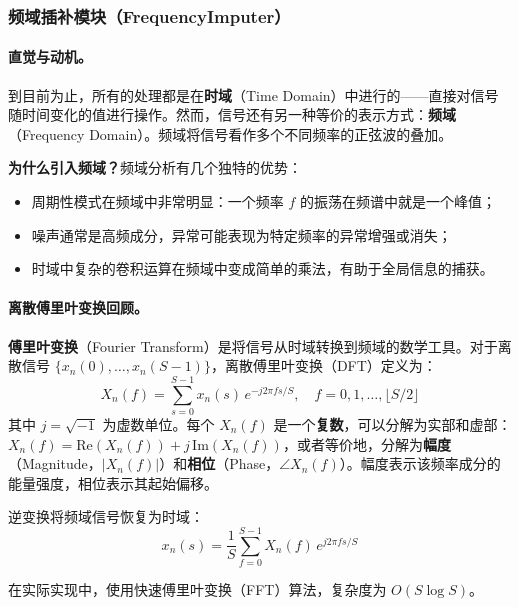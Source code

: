 \documentclass[UTF8]{ctexart}
\begin{document}
\subsubsection{频域插补模块（FrequencyImputer）}

\paragraph{直觉与动机。}

到目前为止，所有的处理都是在\textbf{时域}（Time Domain）中进行的——直接对信号随时间变化的值进行操作。然而，信号还有另一种等价的表示方式：\textbf{频域}（Frequency Domain）。频域将信号看作多个不同频率的正弦波的叠加。

\textbf{为什么引入频域？}频域分析有几个独特的优势：
\begin{itemize}
    \item 周期性模式在频域中非常明显：一个频率 $f$ 的振荡在频谱中就是一个峰值；
    \item 噪声通常是高频成分，异常可能表现为特定频率的异常增强或消失；
    \item 时域中复杂的卷积运算在频域中变成简单的乘法，有助于全局信息的捕获。
\end{itemize}

\paragraph{离散傅里叶变换回顾。}

\textbf{傅里叶变换}（Fourier Transform）是将信号从时域转换到频域的数学工具。对于离散信号 $\{x_n(0), \ldots, x_n(S-1)\}$，离散傅里叶变换（DFT）定义为：
\begin{equation}
    X_n(f) = \sum_{s=0}^{S-1} x_n(s) \, e^{-j 2\pi f s / S}, \quad f = 0, 1, \ldots, \lfloor S/2 \rfloor
\end{equation}
其中 $j = \sqrt{-1}$ 为虚数单位。每个 $X_n(f)$ 是一个\textbf{复数}，可以分解为实部和虚部：$X_n(f) = \mathrm{Re}(X_n(f)) + j \, \mathrm{Im}(X_n(f))$，或者等价地，分解为\textbf{幅度}（Magnitude，$|X_n(f)|$）和\textbf{相位}（Phase，$\angle X_n(f)$）。幅度表示该频率成分的能量强度，相位表示其起始偏移。

逆变换将频域信号恢复为时域：
\begin{equation}
    x_n(s) = \frac{1}{S} \sum_{f=0}^{S-1} X_n(f) \, e^{j 2\pi f s / S}
\end{equation}

在实际实现中，使用快速傅里叶变换（FFT）算法，复杂度为 $O(S \log S)$。
\end{document}
